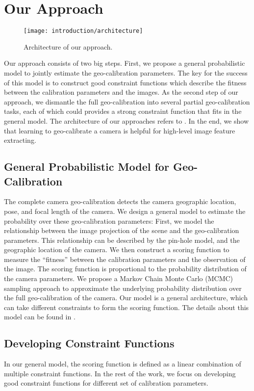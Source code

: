 \section{Our Approach}

\begin{figure}
  \centering
  \texttt{[image: introduction/architecture]}
  \caption{Architecture of our approach.}
  \label{fig:intro:architecture}
\end{figure}

Our approach consists of two big steps. First, we propose a general
probabilistic model to jointly estimate the geo-calibration
parameters. The key for the success of this model is to construct good
constraint functions which describe the fitness between the calibration
parameters and the images. As the second step of our approach, we
dismantle the full geo-calibration into several partial
geo-calibration tasks, each of which could provides a strong constraint
function that fits in the general model. The architecture of
our approaches refers to .
%
In the end, we show that learning to geo-calibrate a camera is helpful
for high-level image feature extracting.


\subsection{General Probabilistic Model for Geo-Calibration}
The complete camera geo-calibration detects the camera
geographic location, pose, and focal length of the camera.  We
design a general model to estimate the probability over these
geo-calibration parameters: First, we model the relationship between the
image projection of the scene and the geo-calibration parameters. This
relationship can be described by the pin-hole model, and
the geographic location of the camera.
We then construct a scoring function to measure the ``fitness'' between the
calibration parameters and the observation of the image. 
The scoring function is proportional to the probability distribution
of the camera parameters. We propose a Markov Chain Monte
Carlo (MCMC) sampling approach to approximate the underlying
probability distribution over the full geo-calibration of the camera.
Our model is a general architecture, which can take different
constraints to form the scoring function. The details about this model
can be found in .

\subsection{Developing Constraint Functions}
In our general model, the scoring function is defined as a linear
combination of multiple constraint functions.
In the rest of the work, we focus on developing good constraint
functions for different set of calibration parameters. 

